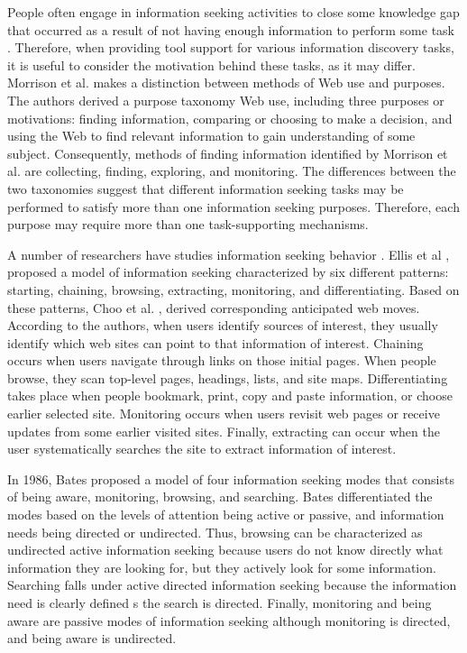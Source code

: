 \documentclass{casconpaper}
\begin{document}
{People often engage in information seeking activities to close some knowledge gap that occurred as a result of not having enough information to perform some task \cite{locke}. Therefore, when providing tool support for various information discovery tasks, it is useful to consider the motivation behind these tasks, as it may differ. Morrison et al. \cite{morrison} makes a distinction between methods of Web use and purposes. The authors derived a purpose taxonomy Web use, including three purposes or motivations: finding information, comparing or choosing to make a decision, and using the Web to find relevant information to gain understanding of some subject. Consequently, methods of finding information identified by Morrison et al. are collecting, finding, exploring, and monitoring. The differences between the two taxonomies suggest that different information seeking tasks may be performed to satisfy more than one information seeking purposes. Therefore, each purpose may require more than one task-supporting mechanisms. 

A number of researchers have studies information seeking behavior \cite{bates2002, bates1986, choo, ellis1989, ellis1997, ellis1993}. Ellis et al \cite{ellis1989, ellis1997, ellis1993}, proposed a model of information seeking characterized by six different patterns: starting, chaining, browsing, extracting, monitoring, and differentiating. Based on these patterns, Choo et al. \cite{choo}, derived corresponding anticipated web moves. According to the authors, when users identify sources of interest, they usually identify which web sites can point to that information of interest.  Chaining occurs when users navigate through links on those initial pages. When people browse, they scan top-level pages, headings, lists, and site maps. Differentiating takes place when people bookmark, print, copy and paste information, or choose earlier selected site. Monitoring occurs when users revisit web pages or receive updates from some earlier visited sites. Finally, extracting can occur when the user systematically searches the site to extract information of interest. 

In 1986, Bates \cite{bates1986} proposed a model of four information seeking modes that consists of being aware, monitoring, browsing, and searching. Bates differentiated the modes based on the levels of attention being active or passive, and information needs being directed or undirected. Thus, browsing can be characterized as undirected active information seeking because users do not know directly what information they are looking for, but they actively look for some information. Searching falls under active directed information seeking because the information need is clearly defined s the search is directed. Finally, monitoring and being aware are passive modes of information seeking although monitoring is directed, and being aware is undirected.   

}
\end{document}
